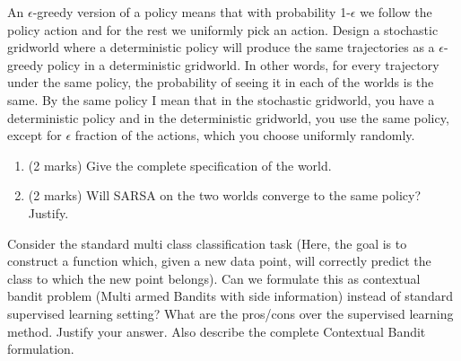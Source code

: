 \documentclass[addpoints,12pt,solution]{exam}
\begin{document}
\begin{questions}
\begin{enumerate}[label=(\alph*)]
\begin{solution}
\end{solution}
    
    
\end{enumerate}

 An $\epsilon$-greedy version of a policy means that with probability 1-$\epsilon$ we follow the policy action and for the rest we uniformly pick an action.
Design a stochastic gridworld where a deterministic policy will produce
the same trajectories as a $\epsilon$-greedy policy in a deterministic
gridworld. In other words, for every trajectory under the same policy, the
probability of seeing it in each of the worlds is the same. By the same policy I mean that in the stochastic gridworld, you have a deterministic policy and in the
deterministic gridworld, you use the same policy, except for $\epsilon$ fraction of the actions, which you choose uniformly randomly. 

\begin{enumerate}[label=(\alph*)]

\item (2 marks) Give the complete specification of the world.

\begin{solution}


\end{solution}


\item (2 marks) Will SARSA on the two worlds converge to the same policy? Justify.

\begin{solution}

\end{solution}

\end{enumerate}

 Consider the standard multi class classification task (Here, the goal is to construct a function which, given a new data point, will correctly predict the class to which the new point belongs). Can we formulate this as contextual bandit problem (Multi armed Bandits with side information) instead of standard supervised learning setting? What are the pros/cons over the supervised learning method. Justify your answer. Also describe the complete Contextual Bandit formulation.

\begin{solution}

\end{solution}


\end{questions}
\end{document}
